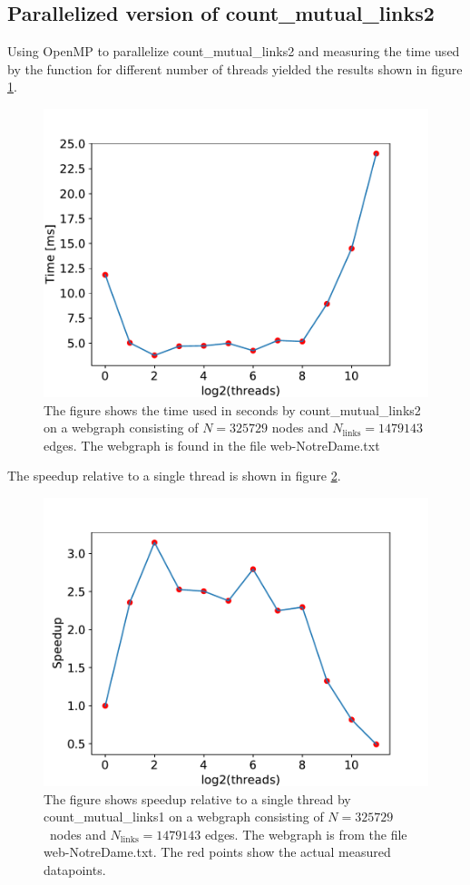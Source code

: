 \documentclass[english,notitlepage, reprint]{revtex4-1}  %
\begin{document}
\subsection*{Parallelized version of count\_mutual\_links2}
Using OpenMP to parallelize count\_mutual\_links2 and measuring the time used by the function for different number of threads yielded the results shown in figure \ref{fig:count_mutual_links2_parallel}.
\begin{figure}[H]
    \centering
    \includegraphics[scale = 0.5]{count_mutual_links2_parallel.pdf}
    \caption{The figure shows the time used  in seconds by count\_mutual\_links2 on a webgraph consisting of $N = 325729$ nodes and $N_\text{links} = 1479143$ edges. The webgraph is found in the file web-NotreDame.txt}\label{fig:count_mutual_links2_parallel}
\end{figure}
The speedup relative to a single thread is shown in figure \ref{fig:count_mutual_links2_speedup}.
\begin{figure}[H]
    \centering
    \includegraphics[scale = 0.5]{count_mutual_links2_speedup.pdf}
    \caption{The figure shows speedup relative to a single thread by count\_mutual\_links1 on a webgraph consisting of $N = 325729$ nodes and $N_\text{links} = 1479143$ edges. The webgraph is from the file web-NotreDame.txt. The red points show the actual measured datapoints.}\label{fig:count_mutual_links2_speedup}
\end{figure}
\end{document}
